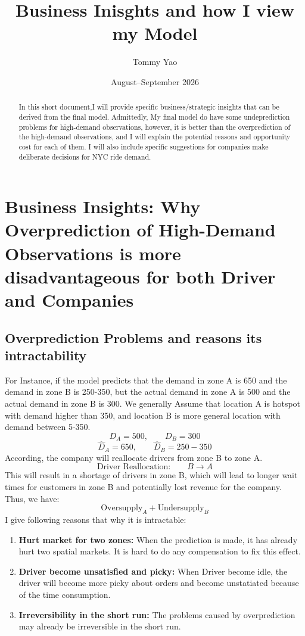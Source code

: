 \documentclass{article}
\title{Business Inisghts and how I view my Model}
\author{Tommy Yao}
\date{August--September 2026}
\begin{document}
\maketitle

\begin{abstract}
In this short document,I will  provide specific business/strategic insights that can be derived from the final model. 
Admittedly, My final model do have some undeprediction problems for high-demand observations, however, it is better 
than the overprediction of the high-demand observations, and I will explain the potential reasons and opportunity cost 
for each of them. I will also include specific suggestions for companies make deliberate decisions for NYC ride demand.
\end{abstract}
\section{Business Insights: Why Overprediction of High-Demand Observations is more disadvantageous for both Driver and Companies}
\subsection{Overprediction Problems and reasons its intractability}
For Instance, if the model predicts that the demand in zone A is 650 and the demand in zone B is 250-350, but the actual demand in zone A is 500 and the actual demand in zone B is 300.
We generally Assume that location A is hotspot with demand higher than 350, and location B is more general location with demand between 5-350.
\[
D_A = 500, \qquad D_B = 300
\]
\[
\hat{D}_A = 650, \qquad \hat{D}_B = 250-350
\]
According, the company
 will reallocate drivers from zone B to zone A. 
\[
\text{Driver Reallocation:} \qquad B \rightarrow A
\]
This will result in a shortage of drivers in zone B, which will lead to longer wait times for customers in zone B and potentially lost revenue for the
company.
Thus, we have:
\[
\text{Oversupply}_A+\text{Undersupply}_B
\]
I give following reasons that why it is intractable:
\begin{enumerate}
    \item \textbf{Hurt market for two zones:}
     When the prediction is made, it has already hurt two spatial markets. 
     It is hard to do any compensation to fix this effect.


    \item \textbf{Driver become unsatisfied and picky:} 
    When Driver become idle, the driver will become more picky about orders 
    and become unstatiated because of the time consumption.


    \item  \textbf{Irreversibility in the short run:}
    The problems caused by overprediction may already be irreversible in the short run.
\end{enumerate}
\end{document}
